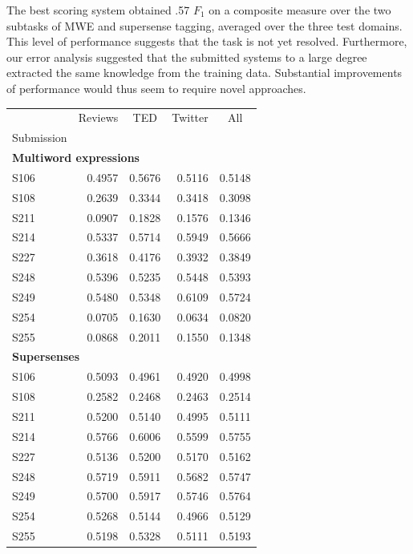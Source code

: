 \documentclass[11pt,letterpaper]{article}
\newcommand{\ensuretext}[1]{#1}
\newcommand{\nssmarker}{\ensuretext{\textcolor{magenta}{\ensuremath{^{\textsc{NS}}_{\textsc{S}}}}}}
\newcommand{\arkcomment}[3]{\ensuretext{\textcolor{#3}{[#1 #2]}}}
\newcommand{\nss}[1]{\arkcomment{\nssmarker}{#1}{magenta}}
\newcommand{\finalversion}[1]{}
\begin{document}
The best scoring system obtained .57 $F_1$ on a composite measure over the two subtasks of MWE and supersense tagging, 
averaged over the three test domains. This level of performance suggests that the task is not yet resolved. 
Furthermore, our error analysis suggested that the submitted systems to a large degree 
extracted the same knowledge from the training data. 
Substantial improvements of performance would thus seem to require novel approaches. 

\finalversion{
\section*{Acknowledgments}
\nss{Sam (annotator), funding}}

\begin{table}\small\centering
\begin{tabular}{lrrrr}
\toprule
{} &  Reviews &   \multicolumn{1}{c}{TED} &  Twitter &  \multicolumn{1}{c}{All} \\
Submission &          &       &          &             \\
\midrule
\multicolumn{5}{l}{\textbf{Multiword expressions}} \\

S106       &   0.4957 &  0.5676 &   0.5116 &      0.5148 \\
S108       &   0.2639 &  0.3344 &   0.3418 &      0.3098 \\
S211       &   0.0907 &  0.1828 &   0.1576 &      0.1346 \\
S214       &   0.5337 &  0.5714 &   0.5949 &      0.5666 \\
S227       &   0.3618 &  0.4176 &   0.3932 &      0.3849 \\
S248       &   0.5396 &  0.5235 &   0.5448 &      0.5393 \\
S249       &   0.5480 &  0.5348 &   0.6109 &      0.5724 \\
S254       &   0.0705 &  0.1630 &   0.0634 &      0.0820 \\
S255       &   0.0868 &  0.2011 &   0.1550 &      0.1348 \\[1.4ex]

\multicolumn{5}{l}{\textbf{Supersenses}} \\

S106       &   0.5093 &  0.4961 &   0.4920 &      0.4998 \\
S108       &   0.2582 &  0.2468 &   0.2463 &      0.2514 \\
S211       &   0.5200 &  0.5140 &   0.4995 &      0.5111 \\
S214       &   0.5766 &  0.6006 &   0.5599 &      0.5755 \\
S227       &   0.5136 &  0.5200 &   0.5170 &      0.5162 \\
S248       &   0.5719 &  0.5911 &   0.5682 &      0.5747 \\
S249       &   0.5700 &  0.5917 &   0.5746 &      0.5764 \\
S254       &   0.5268 &  0.5144 &   0.4966 &      0.5129 \\
S255       &   0.5198 &  0.5328 &   0.5111 &      0.5193 \\[1.4ex]


\end{tabular}
\end{table}
\end{document}
